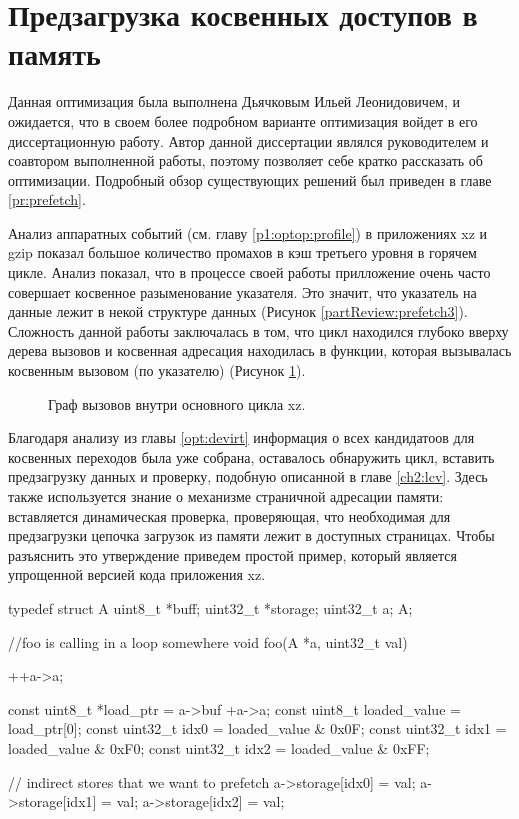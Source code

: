 \section{Предзагрузка косвенных доступов в память} \label{opt:prefetch}
Данная оптимизация была выполнена Дьячковым Ильей Леонидовичем, и ожидается, что в своем более подробном варианте оптимизация войдет в его диссертационную работу.  Автор данной диссертации являлся руководителем и соавтором выполненной работы, поэтому позволяет себе кратко рассказать  об оптимизации.  Подробный обзор существующих решений был приведен в главе \ref{pr:prefetch}. 

Анализ аппаратных событий (см. главу \ref{p1:optop:profile}) в приложениях xz и gzip показал большое количество промахов в кэш третьего уровня в горячем цикле. Анализ показал, что в процессе своей работы прилложение очень часто совершает косвенное разыменование указателя. Это значит, что указатель на данные лежит в некой структуре данных (Рисунок \ref{partReview:prefetch3}). Сложность данной работы заключалась в том, что цикл находился глубоко вверху дерева вызовов и косвенная адресация находилась в функции, которая вызывалась косвенным вызовом (по указателю) (Рисунок \ref{optpref1}). 
\begin{figure}[htbp]
	\centering
	
	\caption{Граф вызовов внутри основного цикла xz.}
	\label{optpref1}
\end{figure}
Благодаря анализу из главы \ref{opt:devirt} информация о всех кандидатоов для косвенных переходов была уже собрана, оставалось обнаружить цикл, вставить предзагрузку данных и проверку, подобную описанной в главе \ref{ch2:lcv}. Здесь также используется знание о механизме страничной адресации памяти: вставляется динамическая проверка, проверяющая, что необходимая для предзагрузки цепочка загрузок из памяти лежит в доступных страницах. Чтобы разъяснить это утверждение приведем простой пример, который является упрощенной версией кода приложения xz.

  \begin{ListingEnv}[!h]
 	\captiondelim{ } %
 	\caption{Образец кода для анализа косвенной предзагрузки данных.}\label{ind_pref1}
 	
 	\begin{Verb}
 	typedef struct A
 	{
 		uint8_t *buff;
 		uint32_t *storage;
 		uint32_t a;
 	} A;
 	
 	//foo is calling in a loop somewhere
 	void foo(A *a, uint32_t val)
 	{
 		++a->a;
 		
 		const uint8_t *load_ptr = a->buf +a->a;
 		const uint8_t loaded_value  = load_ptr[0];
 		const uint32_t idx0 = loaded_value & 0x0F;
 		const uint32_t idx1 = loaded_value & 0xF0;
 		const uint32_t idx2 = loaded_value & 0xFF;
 		
 		// indirect stores that we want to prefetch
 		a->storage[idx0] = val;
 		a->storage[idx1] = val;
 		a->storage[idx2] = val;
 	}
 	\end{Verb}
 \end{ListingEnv}
 

